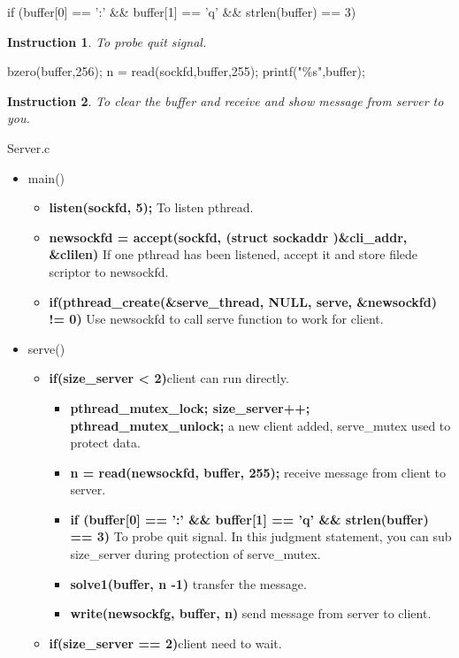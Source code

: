 \documentclass[12pt,a4paper]{article}
\newtheorem*{instruction}{Instruction}
\theoremstyle{definition}
\begin{document}
\begin{enumerate}
\begin{itemize}
		\item if (buffer[0] == ':' \&\& buffer[1] == 'q' \&\& strlen(buffer) == 3)
		\begin{instruction}
			\item
			To probe quit signal.
		\end{instruction}

		\item bzero(buffer,256); n = read(sockfd,buffer,255); printf("\%s",buffer);
		\begin{instruction}
			\item
			To clear the buffer and receive and show message from server to you.
		\end{instruction}
	\end{itemize}

	Server.c
	\begin{itemize}
		\item main()
		\begin{itemize}
			\item \textbf{listen(sockfd, 5);} To listen pthread.
			\item \textbf{newsockfd = accept(sockfd, (struct sockaddr \*)\&cli\_addr, \&clilen)} If one pthread has been listened, accept it and store filede scriptor to newsockfd.
			\item \textbf{if(pthread\_create(\&serve\_thread, NULL, serve, \&newsockfd) != 0)} Use newsockfd to call serve function to work for client.
		\end{itemize}


		\item serve()
		\begin{itemize}
			\item \textbf{if(size\_server < 2)}client can run directly.
			\begin{itemize}
			 	\item \textbf{pthread\_mutex\_lock;	size\_server++; pthread\_mutex\_unlock;} a new client added, serve\_mutex used to protect data.
				\item \textbf{n = read(newsockfd, buffer, 255);} receive message from client to server.
				\item \textbf{if (buffer[0] == ':' \&\& buffer[1] == 'q' \&\& strlen(buffer) == 3)} To probe quit signal. In this judgment statement, you can sub size\_server during protection of serve\_mutex.
				\item \textbf{solve1(buffer, n -1)} transfer the message.
				\item \textbf{write(newsockfg, buffer, n)} send message from server to client.
			\end{itemize}
			\item \textbf{if(size\_server == 2)}client need to wait.


\end{itemize}
\end{itemize}
\end{enumerate}
\end{document}
